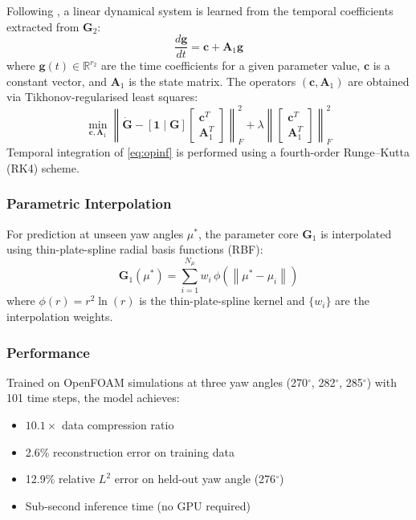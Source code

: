 \documentclass[12pt]{article}
\newcommand{\R}{\mathbb{R}}
\newcommand{\norm}[1]{\left\| #1 \right\|}
\newcommand{\mat}[1]{\mathbf{#1}}
\newcommand{\vect}[1]{\mathbf{#1}}
\begin{document}
Following \citet{Peherstorfer2016}, a linear dynamical system is learned from the temporal coefficients extracted from $\mat{G}_2$:
\begin{equation}
    \frac{d\vect{g}}{dt} = \vect{c} + \mat{A}_1 \vect{g}
    \label{eq:opinf}
\end{equation}
where $\vect{g}(t) \in \R^{r_2}$ are the time coefficients for a given parameter value, $\vect{c}$ is a constant vector, and $\mat{A}_1$ is the state matrix.
The operators $(\vect{c}, \mat{A}_1)$ are obtained via Tikhonov-regularised least squares:
\begin{equation}
    \min_{\vect{c}, \mat{A}_1} \norm{\dot{\mat{G}} - [\mathbf{1} \mid \mat{G}] \begin{bmatrix} \vect{c}^T \\ \mat{A}_1^T \end{bmatrix}}_F^2 + \lambda \norm{\begin{bmatrix} \vect{c}^T \\ \mat{A}_1^T \end{bmatrix}}_F^2
\end{equation}
Temporal integration of \eqref{eq:opinf} is performed using a fourth-order Runge--Kutta (RK4) scheme.

\subsubsection{Parametric Interpolation}

For prediction at unseen yaw angles $\mu^*$, the parameter core $\mat{G}_1$ is interpolated using thin-plate-spline radial basis functions (RBF):
\begin{equation}
    \mat{G}_1(\mu^*) = \sum_{i=1}^{N_\mu} w_i \, \phi(\norm{\mu^* - \mu_i})
\end{equation}
where $\phi(r) = r^2 \ln(r)$ is the thin-plate-spline kernel and $\{w_i\}$ are the interpolation weights.

\subsubsection{Performance}

Trained on OpenFOAM simulations at three yaw angles (270$^\circ$, 282$^\circ$, 285$^\circ$) with 101 time steps, the model achieves:
\begin{itemize}[leftmargin=*]
    \item $10.1\times$ data compression ratio
    \item 2.6\% reconstruction error on training data
    \item 12.9\% relative $L^2$ error on held-out yaw angle (276$^\circ$)
    \item Sub-second inference time (no GPU required)
\end{itemize}
\end{document}
